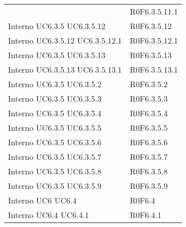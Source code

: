 \begin{longtable}{p{2.5cm}!{\VRule[1pt]}p{2.5cm}}
 & R0F6.3.5.11.1 \\
Interno \newline UC6.3.5
 \newline UC6.3.5.12
 & R0F6.3.5.12 \\
Interno \newline UC6.3.5.12
 \newline UC6.3.5.12.1
 & R0F6.3.5.12.1 \\
Interno \newline UC6.3.5
 \newline UC6.3.5.13
 & R0F6.3.5.13 \\
Interno \newline UC6.3.5.13
 \newline UC6.3.5.13.1
 & R0F6.3.5.13.1 \\
Interno \newline UC6.3.5
 \newline UC6.3.5.2
 & R0F6.3.5.2 \\
Interno \newline UC6.3.5
 \newline UC6.3.5.3
 & R0F6.3.5.3 \\
Interno \newline UC6.3.5
 \newline UC6.3.5.4
 & R0F6.3.5.4 \\
Interno \newline UC6.3.5
 \newline UC6.3.5.5
 & R0F6.3.5.5 \\
Interno \newline UC6.3.5
 \newline UC6.3.5.6
 & R0F6.3.5.6 \\
Interno \newline UC6.3.5
 \newline UC6.3.5.7
 & R0F6.3.5.7 \\
Interno \newline UC6.3.5
 \newline UC6.3.5.8
 & R0F6.3.5.8 \\
Interno \newline UC6.3.5
 \newline UC6.3.5.9
 & R0F6.3.5.9 \\
Interno \newline UC6
 \newline UC6.4
 & R0F6.4 \\
Interno \newline UC6.4
 \newline UC6.4.1
 & R0F6.4.1 \\

\end{longtable}
